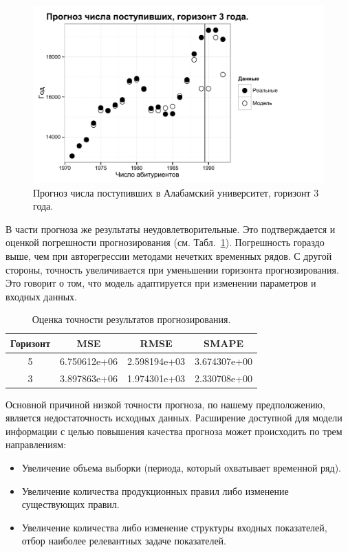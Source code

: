 \documentclass[a4paper,14pt]{article}
\begin{document}
\begin{figure}[bhtp]
	\begin{center}
		\includegraphics{images/UA_model_h=3.pdf}
		\caption{Прогноз числа поступивших в Алабамский университет, \newline горизонт 3 года.}		
		\label{figure:UA_model_h=3}
	\end{center}
\end{figure}

В части прогноза же результаты неудовлетворительные. Это подтверждается и оценкой погрешности прогнозирования (см. Табл.~\ref{table:WM-error}). Погрешность гораздо выше, чем при авторегрессии методами нечетких временных рядов. С другой стороны, точность увеличивается при уменьшении горизонта прогнозирования. Это говорит о том, что модель адаптируется при изменении параметров и входных данных. 

\begin{table}[bhtp]
	\caption{Оценка точности результатов прогнозирования.}
	\begin{center}
		\begin{tabular}{ | c | c | c | c | }
			\hline
			Горизонт & MSE & RMSE & SMAPE \\
			\hline
			5 & 6.750612e+06 & 2.598194e+03 & 3.674307e+00  \\
			\hline
			3 & 3.897863e+06 & 1.974301e+03 & 2.330708e+00  \\
			\hline
		\end{tabular}		
	\end{center}
	\label{table:WM-error}	
\end{table}

Основной причиной низкой точности прогноза, по нашему предположению, является недостаточность исходных данных. Расширение доступной для модели информации с целью повышения качества прогноза может происходить по трем направлениям:
\begin{itemize}
	\item Увеличение объема выборки (периода, который охватывает временной ряд).
	\item Увеличение количества продукционных правил либо изменение существующих правил.
	\item Увеличение количества либо изменение структуры входных показателей, отбор наиболее релевантных задаче показателей.
\end{itemize}
\end{document}
